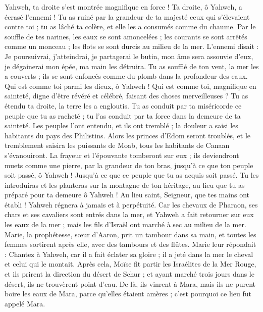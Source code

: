 \begin{multicols}{2}
Yahweh, ta droite s'est montrée magnifique en force ! Ta droite, ô Yahweh, a écrasé l'ennemi !
Tu as ruiné par la grandeur de ta majesté ceux qui s'élevaient contre toi ; tu as lâché ta colère, et elle les a consumés comme du chaume.
Par le souffle de tes narines, les eaux se sont amoncelées ; les courants se sont arrêtés comme un monceau ; les flots se sont durcis au milieu de la mer.
L'ennemi disait : Je poursuivrai, j'atteindrai, je partagerai le butin, mon âme sera assouvie d'eux, je dégainerai mon épée, ma main les détruira.
Tu as soufflé de ton vent, la mer les a couverts ; ils se sont enfoncés comme du plomb dans la profondeur des eaux.
Qui est comme toi parmi les dieux, ô Yahweh ! Qui est comme toi, magnifique en sainteté, digne d'être révéré et célébré, faisant des choses merveilleuses ?
Tu as étendu ta droite, la terre les a engloutis.
Tu as conduit par ta miséricorde ce peuple que tu as racheté ; tu l'as conduit par ta force dans la demeure de ta sainteté.
Les peuples l'ont entendu, et ils ont tremblé ; la douleur a saisi les habitants du pays des Philistins.
Alors les princes d'Edom seront troublés, et le tremblement saisira les puissants de Moab, tous les habitants de Canaan s’évanouiront.
La frayeur et l'épouvante tomberont sur eux ; ils deviendront muets comme une pierre, par la grandeur de ton bras, jusqu'à ce que ton peuple soit passé, ô Yahweh ! Jusqu'à ce que ce peuple que tu as acquis soit passé.
Tu les introduiras et les planteras sur la montagne de ton héritage, au lieu que tu as préparé pour ta demeure ô Yahweh ! Au lieu saint, Seigneur, que tes mains ont établi !
Yahweh régnera à jamais et à perpétuité.
Car les chevaux de Pharaon, ses chars et ses cavaliers sont entrés dans la mer, et Yahweh a fait retourner sur eux les eaux de la mer ; mais les fils d'Israël ont marché à sec au milieu de la mer.
Marie, la prophétesse, sœur d'Aaron, prit un tambour dans sa main, et toutes les femmes sortirent après elle, avec des tambours et des flûtes.
Marie leur répondait : Chantez à Yahweh, car il a fait éclater sa gloire ; il a jeté dans la mer le cheval et celui qui le montait.
Après cela, Moïse fit partir les Israélites de la Mer Rouge, et ils prirent la direction du désert de Schur ; et ayant marché trois jours dans le désert, ils ne trouvèrent point d'eau.
De là, ils vinrent à Mara, mais ils ne purent boire les eaux de Mara, parce qu'elles étaient amères ; c'est pourquoi ce lieu fut appelé Mara.

\end{multicols}
